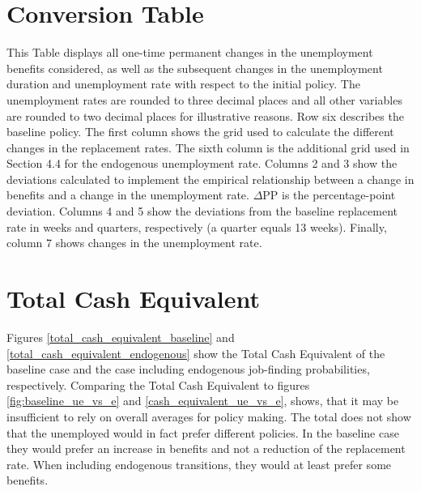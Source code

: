 \documentclass[a4paper,11pt]{article}
\begin{document}

\newpage

\appendix

\section{Conversion Table}

\begin{table}[!htbp]
\centering
\label{conversiontable}
 

\begin{minipage}{0.97\linewidth}
\footnotesize{This Table displays all one-time permanent changes in the unemployment benefits considered, as well as the subsequent changes in the unemployment duration and unemployment rate with respect to the initial policy. The unemployment rates are rounded to three decimal places and all other variables are rounded to two decimal places for illustrative reasons. Row six describes the baseline policy. The first column shows the grid used to calculate the different changes in the replacement rates. The sixth column is the additional grid used in Section 4.4 for the endogenous unemployment rate. Columns 2 and 3 show the deviations calculated to implement the empirical relationship between a change in benefits and a change in the unemployment rate. $\Delta$PP is the percentage-point deviation. Columns 4 and 5 show the deviations from the baseline replacement rate in weeks and quarters, respectively (a quarter equals 13 weeks). Finally, column 7 shows changes in the unemployment rate.}
\end{minipage}

\end{table}


\section{Total Cash Equivalent}
Figures \ref{total_cash_equivalent_baseline} and \ref{total_cash_equivalent_endogenous} show the Total Cash Equivalent of the baseline case and the case including endogenous job-finding probabilities, respectively. Comparing the Total Cash Equivalent to figures \ref{fig:baseline_ue_vs_e} and \ref{cash_equivalent_ue_vs_e}, shows, that it may be insufficient to rely on overall averages for policy making. The total does not show that the unemployed would in fact prefer different policies. In the baseline case they would prefer an increase in benefits and not a reduction of the replacement rate. When including endogenous transitions, they would at least prefer some benefits. 
\end{document}

